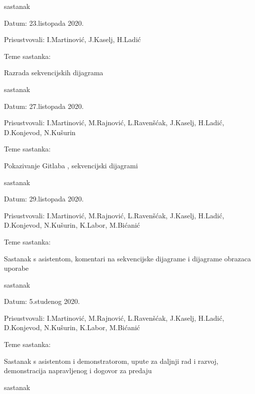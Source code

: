 \begin{packed_enum}
			
			\item sastanak
			\item[] \begin{packed_item}
				\item Datum: 23.listopada 2020.
				\item Prisustvovali: I.Martinović, J.Kaselj, H.Ladić
				\item Teme sastanka: 
				\begin{packed_item}
					\item   Razrada sekvencijskih dijagrama
				\end{packed_item}
			\end{packed_item}

                         \item sastanak
			\item[] \begin{packed_item}
				\item Datum: 27.listopada 2020.
				\item Prisustvovali: I.Martinović, M.Rajnović, L.Ravenšćak, J.Kaselj, H.Ladić, D.Konjevod, N.Kušurin
				\item Teme sastanka: 
				\begin{packed_item}
					\item   Pokazivanje Gitlaba , sekvencijski dijagrami
				\end{packed_item}
			\end{packed_item}
			
			\item sastanak
			
			\item[] \begin{packed_item}
				\item Datum: 29.listopada 2020.
				\item Prisustvovali: I.Martinović, M.Rajnović, L.Ravenšćak, J.Kaselj, H.Ladić, D.Konjevod, N.Kušurin, K.Labor, M.Bićanić
				\item Teme sastanka: 
				\begin{packed_item}
					\item   Sastanak s asistentom, komentari na sekvencijske dijagrame i dijagrame obrazaca uporabe
				\end{packed_item}
			\end{packed_item}
		\item sastanak
		
		\item[] \begin{packed_item}
			\item Datum: 5.studenog 2020.
			\item Prisustvovali: I.Martinović, M.Rajnović, L.Ravenšćak, J.Kaselj, H.Ladić, D.Konjevod, N.Kušurin, K.Labor, M.Bićanić
			\item Teme sastanka: 
			\begin{packed_item}
				\item   Sastanak s asistentom i demonstratorom, upute za daljnji rad i razvoj, demonstracija napravljenog i dogovor za predaju
			\end{packed_item}
		\end{packed_item}
	\item sastanak
	

\end{packed_enum}
